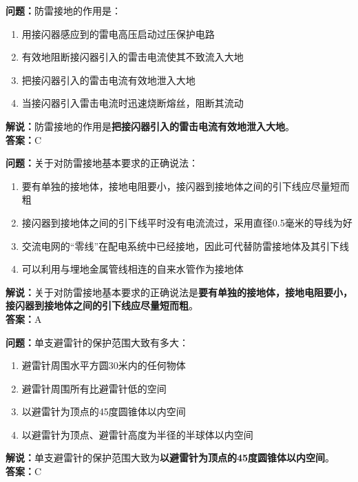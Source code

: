 \bigskip



\noindent\textbf{问题：}防雷接地的作用是：
\begin{enumerate}[label=\Alph*), leftmargin=3em]
	\item 用接闪器感应到的雷电高压启动过压保护电路
	\item 有效地阻断接闪器引入的雷击电流使其不致流入大地
	\item 把接闪器引入的雷击电流有效地泄入大地
	\item 当接闪器引入雷击电流时迅速烧断熔丝，阻断其流动
\end{enumerate}
\noindent\textbf{解说：}防雷接地的作用是\textbf{把接闪器引入的雷击电流有效地泄入大地}。\\\noindent\textbf{答案：}C


\bigskip



\noindent\textbf{问题：}关于对防雷接地基本要求的正确说法：
\begin{enumerate}[label=\Alph*), leftmargin=3em]
	\item 要有单独的接地体，接地电阻要小，接闪器到接地体之间的引下线应尽量短而粗
	\item 接闪器到接地体之间的引下线平时没有电流流过，采用直径0.5毫米的导线为好
	\item 交流电网的“零线”在配电系统中已经接地，因此可代替防雷接地体及其引下线
	\item 可以利用与埋地金属管线相连的自来水管作为接地体
\end{enumerate}
\noindent\textbf{解说：}关于对防雷接地基本要求的正确说法是\textbf{要有单独的接地体，接地电阻要小，接闪器到接地体之间的引下线应尽量短而粗}。\\\noindent\textbf{答案：}A


\bigskip



\noindent\textbf{问题：}单支避雷针的保护范围大致有多大：
\begin{enumerate}[label=\Alph*), leftmargin=3em]
	\item 避雷针周围水平方圆30米内的任何物体
	\item 避雷针周围所有比避雷针低的空间
	\item 以避雷针为顶点的45度圆锥体以内空间
	\item 以避雷针为顶点、避雷针高度为半径的半球体以内空间
\end{enumerate}
\noindent\textbf{解说：}单支避雷针的保护范围大致为\textbf{以避雷针为顶点的45度圆锥体以内空间}。\\\noindent\textbf{答案：}C


